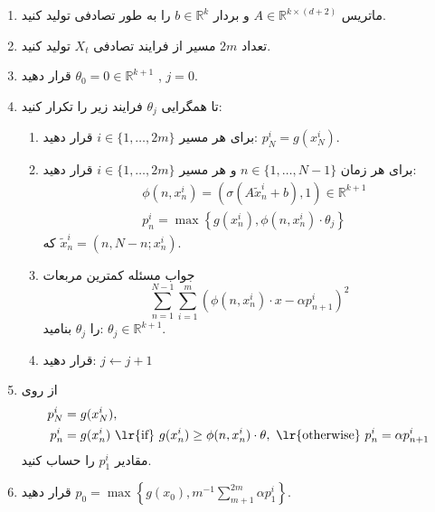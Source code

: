 \documentclass[hidelinks, 11pt]{article}
\begin{document}
\begin{enumerate}[1:]
\item


 ماتریس \(A\in\mathbb{R}^{k\times(d+2)}\) و بردار \(b\in\mathbb{R}^{k}\)
  را به طور تصادفی تولید کنید.

\item

 تعداد \(2m\) مسیر از فرایند تصادفی \(X_{t}\) تولید کنید.

\item

قرار دهید \(\theta_{0}=0\in\mathbb{R}^{k+1}\) , \(j=0\).

\item

 تا همگرایی \(\theta_{j}\) فرایند زیر را تکرار کنید:

   \begin{enumerate}[a:]
   \item

  برای هر مسیر \(i\in\{1,\dots,2m\}\) قرار دهید:
  \(p_{N}^{i}=g(x_{N}^{i})\).

   \item

   برای هر زمان \(n\in\{1,\dots,N-1\}\) و هر مسیر \(i\in\{1,\dots,2m\}\)
   قرار دهید:
   \begin{align*}
     & \phi(n,x_{n}^{i})
      = \left(\sigma(A\widetilde{x}_{n}^{i}+b), 1\right) \in \mathbb{R}^{k+1}  \\
     & p_{n}^{i}
      = \max \left\{ g(x_{n}^{i}), \phi(n,x_{n}^{i})\cdot\theta_{j} \right\}
   \end{align*}
   که \(\widetilde{x}_{n}^{i}=(n,N-n;x_{n}^{i})\).

   \item

   جواب مسئله کمترین مربعات
   \begin{equation*}
     \sum_{n=1}^{N-1} \sum_{i=1}^{m}
     \left( \phi(n, x_{n}^{i}) \cdot x - \alpha p_{n+1}^{i} \right)^{2}
   \end{equation*}
   را \(\theta_{j}\) بنامید: \(\theta_{j}\in\mathbb{R}^{k+1}\).

   \item

   قرار دهید: \(j\leftarrow j+1\)

   \end{enumerate}

\item

از روی
\begin{align*}
  p_{N}^{i} & = g(x_{N}^{i}), \\
  p_{n}^{i} & =
    g(x_{n}^{i}) \text{ \lr{if} } g(x_{n}^{i}) \geq \phi(n,x_{n}^{i})\cdot\theta,
    \text{ \lr{otherwise} } p_{n}^{i} = \alpha p_{n+1}^{i}
\end{align*}
مقادیر \(p_{1}^{i}\) را حساب کنید.

\item

قرار دهید \(p_{0}=\max\left\{g(x_{0}),m^{-1}\sum_{m+1}^{2m}\alpha p_{1}^{i}\right\}\).


\end{enumerate}
\end{document}
